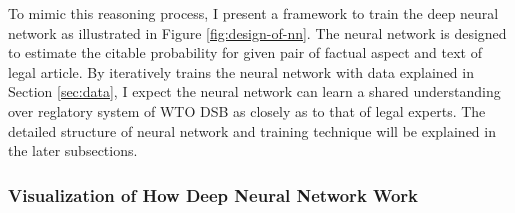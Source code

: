 \documentclass[12pt,letterpaper]{article}
\begin{document}
To mimic this reasoning process, I present a framework to train the deep neural network as illustrated in Figure \ref{fig:design-of-nn}.
The neural network is designed to estimate the citable probability for given pair of factual aspect and text of legal article. 
By iteratively trains the neural network with data explained in Section \ref{sec:data}, I expect the neural network can learn a shared understanding over reglatory system of WTO DSB as closely as to that of legal experts.
The detailed structure of neural network and training technique will be explained in the later subsections.







\subsubsection{Visualization of How Deep Neural Network Work} 








\end{document}
